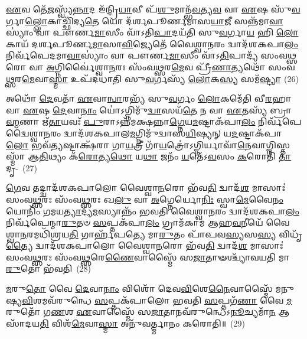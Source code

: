 \-\ul{𑌏}\-𑌵 𑌤𑍇᳴\-\ul{𑌜}\-𑌸𑍍𑌵𑍍𑌯᳴\-\ul{𑌨𑍍𑌨𑌾}\-𑌦 𑌇᳴𑌨𑍍𑌦𑍍𑌰𑌿\-\ul{𑌯𑌾}\-𑌵𑍀 𑌪᳴\-\ul{𑌶𑍁}\-𑌮𑌾𑌨𑍍𑌭᳴\-\ul{𑌵}\-𑌤𑍍𑌯\-\ul{𑌵} 𑌵𑌾 \ul{𑌏}\-𑌷 𑌸𑍁᳴\-\ul{𑌵}\-𑌰𑍍𑌗𑌾\-\ul{𑌲𑍍𑌲𑍋}\-𑌕𑌾𑌚𑍍𑌛𑌿᳴𑌦𑍍𑌯\-\ul{𑌤𑍇} 𑌯𑍋 𑌦᳴𑌰𑍍\mbox{}𑌶𑌪𑍂𑌰𑍍𑌣𑌮𑌾𑌸\-\ul{𑌯𑌾}\-𑌜𑍀 𑌸𑌨𑍍𑌨᳴𑌮𑌾\-\ul{𑌵𑌾}\-𑌸𑍍𑌯𑌾𑌂॑ 𑌵𑌾 𑌪𑍗𑌰𑍍𑌣\-\ul{𑌮𑌾}\-𑌸𑍀𑌂 𑌵𑌾᳴\-𑌽𑌤𑌿\-\ul{𑌪𑌾}\-𑌦𑌯᳴𑌤𑌿 𑌸𑍁\-\ul{𑌵}\-𑌰𑍍𑌗𑌾\-\ul{𑌯} 𑌹𑌿 \ul{𑌲𑍋}\-𑌕𑌾𑌯᳴ 𑌦𑌰𑍍\mbox{}𑌶𑌪𑍂𑌰𑍍𑌣\-\ul{𑌮𑌾}\-𑌸𑌾\-\ul{𑌵𑌿}\-𑌜𑍍𑌯𑍇𑌤𑍇᳴ 𑌵𑍈𑌶𑍍𑌵𑌾\-\ul{𑌨}\-𑌰𑌂 𑌦𑍍𑌵𑌾𑌦᳴𑌶\-𑌕𑌪𑌾\-\ul{𑌲𑌂} 𑌨𑌿𑌰𑍍𑌵᳴𑌪𑍇𑌦𑌮𑌾\-\ul{𑌵𑌾}\-𑌸𑍍𑌯𑌾𑌂॑ 𑌵𑌾 𑌪𑍗𑌰𑍍𑌣\-\ul{𑌮𑌾}\-𑌸𑍀𑌂 𑌵𑌾᳴\-𑌽\-\ul{𑌤𑌿}\-𑌪𑌾𑌦𑍍𑌯᳴ 𑌸𑌂𑌵\-\ul{𑌥𑍍𑌸}\-𑌰𑍋 𑌵𑌾 \ul{𑌅}\-𑌗𑍍𑌨𑌿𑌰𑍍𑌵𑍈॑𑌶𑍍𑌵𑌾\-\ul{𑌨}\-𑌰𑌃 𑌸𑌂᳴𑌵\-\ul{𑌥𑍍𑌸}\-𑌰\-\ul{𑌮𑍇}\-𑌵 𑌪𑍍𑌰𑍀᳴\-\ul{𑌣𑌾}\-𑌤𑍍𑌯𑌥𑍋᳴ 𑌸𑌂𑌵\-\ul{𑌥𑍍𑌸}\-𑌰\-\ul{𑌮𑍇}\-𑌵𑌾\-\ul{𑌸𑍍𑌮𑌾} 𑌉𑌪᳴𑌦𑌧𑌾𑌤𑌿 𑌸𑍁\-\ul{𑌵}\-𑌰𑍍𑌗𑌸𑍍𑌯᳴ \ul{𑌲𑍋}\-𑌕\-\ul{𑌸𑍍𑌯} 𑌸𑌮᳴\-\ul{𑌷𑍍𑌟𑍍𑌯𑌾}\-~(26)

𑌅𑌥𑍋᳴ \ul{𑌦𑍇}\-𑌵𑌤𑌾᳴ \ul{𑌏}\-𑌵𑌾\-\ul{𑌨𑍍𑌵𑌾}\-𑌰𑌭𑍍𑌯᳴ 𑌸𑍁\-\ul{𑌵}\-𑌰𑍍𑌗𑌂 \ul{𑌲𑍋}\-𑌕𑌮𑍇᳴𑌤𑌿 𑌵𑍀\-\ul{𑌰}\-𑌹𑌾 𑌵𑌾 \ul{𑌏}\-𑌷 \ul{𑌦𑍇}\-𑌵𑌾\-\ul{𑌨𑌾𑌂} 𑌯𑍋॑\-𑌽𑌗𑍍𑌨𑌿𑌮𑍁᳴\-\ul{𑌦𑍍𑌵𑌾}\-𑌸𑌯᳴\-\ul{𑌤𑍇} 𑌨 𑌵𑌾 \ul{𑌏}\-𑌤𑌸𑍍𑌯᳴ 𑌬𑍍𑌰𑌾\-\ul{𑌹𑍍𑌮}\-𑌣𑌾 𑌋᳴\-\ul{𑌤𑌾}\-𑌯𑌵𑌃᳴ \ul{𑌪𑍁}\-𑌰𑌾\-𑌽𑌨𑍍𑌨᳴𑌮𑌕𑍍𑌷𑌨𑍍𑌨𑌾\-\ul{𑌗𑍍𑌨𑍇}\-𑌯\-\ul{𑌮}\-𑌷𑍍𑌟𑌾\-𑌕᳴𑌪𑌾\-\ul{𑌲𑌂} 𑌨𑌿𑌰𑍍𑌵᳴𑌪𑍇𑌦𑍍𑌵𑍈𑌶𑍍𑌵𑌾\-\ul{𑌨}\-𑌰𑌂 𑌦𑍍𑌵𑌾𑌦᳴𑌶\-𑌕𑌪𑌾𑌲\-\ul{𑌮}\-𑌗𑍍𑌨𑌿\-𑌮𑍁᳴𑌦𑍍𑌵𑌾𑌸\-\ul{𑌯𑌿}\-𑌷𑍍𑌯𑌨𑍍 𑌯\-\ul{𑌦}\-𑌷𑍍𑌟𑌾𑌕᳴𑌪𑌾\-\ul{𑌲𑍋} 𑌭𑌵᳴\-\ul{𑌤𑍍𑌯}\-𑌷𑍍𑌟𑌾𑌕𑍍𑌷᳴𑌰𑌾 𑌗𑌾\-\ul{𑌯}\-𑌤𑍍𑌰𑍀 𑌗𑌾᳴\-\ul{𑌯}\-𑌤𑍍𑌰𑍋॑\-𑌽𑌗𑍍𑌨𑌿𑌰𑍍𑌯𑌾𑌵𑌾᳴\-\ul{𑌨𑍇}\-𑌵𑌾𑌗𑍍𑌨𑌿𑌸𑍍𑌤𑌸𑍍𑌮𑌾᳴ 𑌆\-\ul{𑌤𑌿}\-𑌥𑍍𑌯𑌂 𑌕᳴\-\ul{𑌰𑍋}\-𑌤𑍍𑌯\-\ul{𑌥𑍋} 𑌯\-\ul{𑌥𑌾} 𑌜𑌨𑌂᳴ \ul{𑌯}\-𑌤𑍇᳴\-𑌽\-\ul{𑌵}\-𑌸𑌂 \ul{𑌕}\-𑌰𑍋𑌤𑌿᳴ \ul{𑌤𑌾}\-𑌦𑍃-~(27)

\-\ul{𑌗𑍇}\-𑌵 𑌤𑌦𑍍𑌦𑍍𑌵𑌾𑌦᳴𑌶\-𑌕𑌪𑌾𑌲𑍋 𑌵𑍈𑌶𑍍𑌵𑌾\-\ul{𑌨}\-𑌰𑍋 𑌭᳴𑌵\-\ul{𑌤𑌿} 𑌦𑍍𑌵𑌾𑌦᳴\-\ul{𑌶} 𑌮𑌾𑌸𑌾𑌃॑ 𑌸𑌂𑌵\-\ul{𑌥𑍍𑌸}\-𑌰𑌃 𑌸𑌂᳴𑌵\-\ul{𑌥𑍍𑌸}\-𑌰𑌃 𑌖\-\ul{𑌲𑍁} 𑌵𑌾 \ul{𑌅}\-𑌗𑍍𑌨𑍇𑌰𑍍𑌯𑍋\-\ul{𑌨𑌿𑌃} 𑌸𑍍𑌵𑌾\-\ul{𑌮𑍇}\-𑌵𑍈\-\ul{𑌨𑌂} 𑌯𑍋𑌨𑌿𑌂᳴ 𑌗𑌮𑌯\-\ul{𑌤𑍍𑌯𑌾}\-𑌦𑍍𑌯᳴\-\ul{𑌮}\-𑌸𑍍𑌯𑌾𑌨𑍍𑌨𑌂᳴ 𑌭𑌵𑌤𑌿 𑌵𑍈𑌶𑍍𑌵𑌾\-\ul{𑌨}\-𑌰𑌂 𑌦𑍍𑌵𑌾𑌦᳴𑌶\-𑌕𑌪𑌾\-\ul{𑌲𑌂} 𑌨𑌿𑌰𑍍𑌵᳴𑌪𑍇𑌨𑍍𑌮𑌾\-\ul{𑌰𑍁}\-𑌤𑍞 \ul{𑌸}\-𑌪𑍍𑌤𑌕᳴𑌪𑌾\-\ul{𑌲𑌂} 𑌗𑍍𑌰𑌾𑌮᳴𑌕𑌾𑌮 𑌆𑌹\-\ul{𑌵}\-𑌨𑍀𑌯𑍇᳴ 𑌵𑍈𑌶𑍍𑌵𑌾\-\ul{𑌨}\-𑌰𑌮𑌧𑌿᳴𑌶𑍍𑌰𑌯\-\ul{𑌤𑌿} 𑌗𑌾𑌰𑍍\mbox{}𑌹᳴𑌪𑌤𑍍𑌯𑍇 𑌮𑌾\-\ul{𑌰𑍁}\-𑌤𑌂 𑌪𑌾᳴𑌪𑌵\-\ul{𑌸𑍍𑌯}\-𑌸\-\ul{𑌸𑍍𑌯} 𑌵𑌿𑌧𑍃᳴\-\ul{𑌤𑍍𑌯𑍈} 𑌦𑍍𑌵𑌾𑌦᳴𑌶\-𑌕𑌪𑌾𑌲𑍋 𑌵𑍈𑌶𑍍𑌵𑌾\-\ul{𑌨}\-𑌰𑍋 𑌭᳴𑌵\-\ul{𑌤𑌿} 𑌦𑍍𑌵𑌾𑌦᳴\-\ul{𑌶} 𑌮𑌾𑌸𑌾𑌃॑ 𑌸𑌂𑌵\-\ul{𑌥𑍍𑌸}\-𑌰𑌃 𑌸𑌂᳴𑌵\-\ul{𑌥𑍍𑌸}\-𑌰𑍇\-\ul{𑌣𑍈}\-𑌵𑌾𑌸𑍍𑌮𑍈᳴ 𑌸\-\ul{𑌜𑌾}\-𑌤𑌾𑍟𑌶𑍍𑌚𑍍𑌯𑌾᳴𑌵𑌯𑌤𑌿 𑌮𑌾\-\ul{𑌰𑍁}\-𑌤𑍋 𑌭᳴𑌵𑌤𑌿~(28)

\-\ul{𑌮}\-𑌰𑍁\-\ul{𑌤𑍋} 𑌵𑍈 \ul{𑌦𑍇}\-𑌵𑌾\-\ul{𑌨𑌾𑌂} 𑌵𑌿𑌶𑍋᳴ 𑌦𑍇𑌵\-\ul{𑌵𑌿}\-𑌶𑍇\-\ul{𑌨𑍈}\-𑌵𑌾𑌸𑍍𑌮𑍈᳴ 𑌮𑌨𑍁𑌷𑍍𑌯\-\ul{𑌵𑌿}\-𑌶𑌮𑌵᳴\-𑌰𑍁𑌨𑍍𑌧𑍇 \ul{𑌸}\-𑌪𑍍𑌤𑌕᳴𑌪𑌾𑌲𑍋 𑌭𑌵𑌤𑌿 \ul{𑌸}\-𑌪𑍍𑌤𑌗᳴\-\ul{𑌣𑌾} 𑌵𑍈 \ul{𑌮}\-𑌰𑍁𑌤𑍋᳴ 𑌗\-\ul{𑌣}\-𑌶 \ul{𑌏}\-𑌵𑌾𑌸𑍍𑌮𑍈᳴ 𑌸\-\ul{𑌜𑌾}\-𑌤𑌾𑌨𑌵᳴\-𑌰𑍁𑌨𑍍𑌧𑍇\-𑌽\-\ul{𑌨𑍂}\-𑌚𑍍𑌯𑌮𑌾᳴\-\ul{𑌨} 𑌆𑌸𑌾᳴𑌦𑌯\-\ul{𑌤𑌿} 𑌵𑌿𑌶᳴\-\ul{𑌮𑍇}\-𑌵𑌾\-\ul{𑌸𑍍𑌮𑌾} 𑌅𑌨𑍁᳴𑌵𑌰𑍍𑌤𑍍𑌮𑌾𑌨𑌂 𑌕𑌰𑍋𑌤𑌿॥~(29)

{\anuvakamend[{\-\ul{𑌪𑍍𑌰}\-𑌜𑌾𑌕𑌾᳴𑌮𑌃 𑌸𑌂𑌵\-\ul{𑌥𑍍𑌸}\-𑌰𑌃 \ul{𑌪𑍁}\-𑌨𑌾\-\ul{𑌤𑍍𑌯𑍇}\-𑌵𑍈𑌨𑌂᳴ \ul{𑌪𑍂}\-𑌤𑌃 𑌸𑌮᳴𑌷𑍍𑌟𑍍𑌯𑍈 \ul{𑌤𑌾}\-𑌦𑍃𑌙𑍍𑌮𑌾᳴\-\ul{𑌰𑍁}\-𑌤𑍋 𑌭᳴\-\ul{𑌵}\-𑌤𑍍𑌯𑍇\-\ul{𑌕𑌾}\-𑌨𑍍𑌨\-\ul{𑌤𑍍𑌰𑌿}\-\-\ul{𑍞}\-𑌶𑌚𑍍𑌚᳴}]}%

